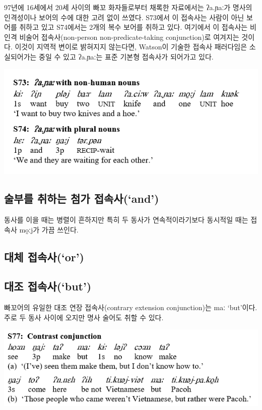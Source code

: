 97년에 16세에서 20세 사이의 빠꼬 화자들로부터 채록한 자료에서는 ʔa.ɲaː가 명사의 인격성이나 보어의 수에 대한 고려 없이 쓰였다. S73에서 이 접속사는 사람이 아닌 보어를 취하고 있고 S74에서는 2개의 복수 보어를 취하고 있다. 여기에서 이 접속사는 비인격 비술어 접속사(non-person non-predicate-taking conjunction)로 여겨지는 것이다. 이것이 지역적 변이로 밝혀지지 않는다면, Watson이 기술한 접속사 패러다임은 소실되어가는 중일 수 있고 ʔa.ɲaː는 표준 기본형 접속사가 되어가고 있다.

\includegraphics{Pacoh/src/PacohS73.png}

\subsection{술부를 취하는 첨가 접속사(`and')}
동사를 이을 때는 병렬이 흔하지만 특히 두 동사가 연속적이라기보다 동시적일 때는 접속사 mo̰ːj가 가끔 쓰인다.

\subsection{대체 접속사(`or')}
\omission

\subsection{대조 접속사(`but')}
빠꼬어의 유일한 대조 연장 접속사(contrary extension conjunction)는 maː `but'이다. 주로 두 동사 사이에 오지만 명사 술어도 취할 수 있다.

\includegraphics{Pacoh/src/PacohMaExample.png}


